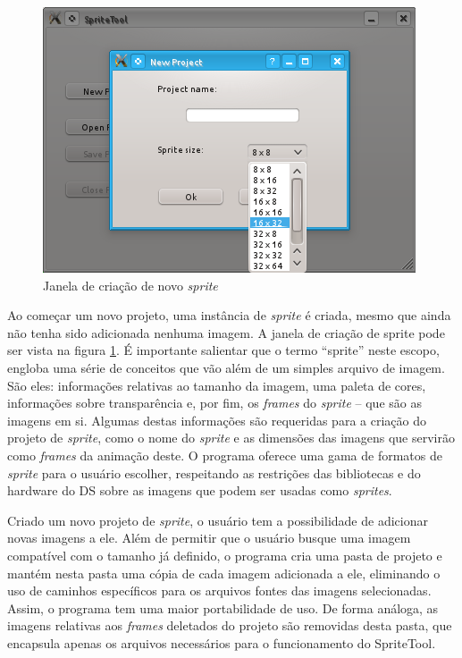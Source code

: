 \documentclass[brazil]{abnt}
\begin{document}
\begin{figure}[h!]
\centering
\includegraphics{imgs/spritetool1.png}
\caption{Janela de criação de novo \textit{sprite}}
\label{fig:spritetool1}
\end{figure}

Ao começar um novo projeto, uma instância de \textit{sprite} é criada, mesmo que ainda não tenha sido adicionada nenhuma imagem. A janela de criação de sprite pode ser vista na figura \ref{fig:spritetool1}. É importante salientar que o termo ``sprite'' neste escopo, engloba uma série de conceitos que vão além de um simples arquivo de imagem. São eles: informações relativas ao tamanho da imagem, uma paleta de cores, informações sobre transparência e, por fim, os \textit{frames} do \textit{sprite} – que são as imagens em si.
Algumas destas informações são requeridas para a criação do projeto de \textit{sprite}, como o nome do \textit{sprite} e as dimensões das imagens que servirão como \textit{frames} da animação deste. O programa oferece uma gama de formatos de \textit{sprite} para o usuário escolher, respeitando as restrições das bibliotecas e do hardware do DS sobre as imagens que podem ser usadas como \textit{sprites}.

Criado um novo projeto de \textit{sprite}, o usuário tem a possibilidade de adicionar novas imagens a ele. Além de permitir que o usuário busque uma imagem compatível com o tamanho já definido, o programa cria uma pasta de projeto e mantém nesta pasta uma cópia de cada imagem adicionada a ele, eliminando o uso de caminhos específicos para os arquivos fontes das imagens selecionadas. Assim, o programa tem uma maior portabilidade de uso. De forma análoga, as imagens relativas aos \textit{frames} deletados do projeto são removidas desta pasta, que encapsula apenas os arquivos necessários para o funcionamento do SpriteTool.
\end{document}
